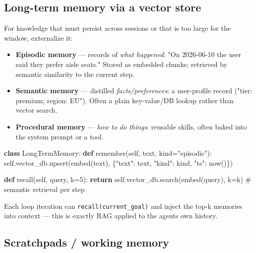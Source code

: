 \documentclass[11pt]{article}
\providecommand{\tightlist}{\setlength{\itemsep}{1pt}\setlength{\parskip}{0pt}}
\newenvironment{Shaded}{\begin{snugshade}}{\end{snugshade}}
\newcommand{\CommentTok}[1]{\textcolor[rgb]{0.48,0.49,0.49}{#1}}
\newcommand{\ControlFlowTok}[1]{\textcolor[rgb]{0.99,0.74,0.29}{\textbf{#1}}}
\newcommand{\DecValTok}[1]{\textcolor[rgb]{0.96,0.45,0.00}{#1}}
\newcommand{\KeywordTok}[1]{\textcolor[rgb]{0.81,0.81,0.76}{\textbf{#1}}}
\newcommand{\NormalTok}[1]{\textcolor[rgb]{0.81,0.81,0.76}{#1}}
\newcommand{\OperatorTok}[1]{\textcolor[rgb]{0.81,0.81,0.76}{#1}}
\newcommand{\StringTok}[1]{\textcolor[rgb]{0.96,0.31,0.31}{#1}}
\newcommand{\VariableTok}[1]{\textcolor[rgb]{0.15,0.68,0.68}{#1}}
\begin{document}
\subsection{Long-term memory via a vector store}\label{long-term-memory-via-a-vector-store}

For knowledge that must persist across sessions or that is too large for the window, externalize it:

\begin{itemize}
\tightlist
\item
  \textbf{Episodic memory} --- records of \emph{what happened}: "On 2026-06-10 the user said they prefer aisle seats." Stored as embedded chunks; retrieved by semantic similarity to the current step.
\item
  \textbf{Semantic memory} --- distilled \emph{facts/preferences}: a user-profile record ("tier: premium; region: EU"). Often a plain key-value/DB lookup rather than vector search.
\item
  \textbf{Procedural memory} --- \emph{how to do things}: reusable skills, often baked into the system prompt or a tool.
\end{itemize}


\begin{Shaded}
\begin{Highlighting}[]
\KeywordTok{class}\NormalTok{ LongTermMemory:}
    \KeywordTok{def}\NormalTok{ remember(}\VariableTok{self}\NormalTok{, text, kind}\OperatorTok{=}\StringTok{"episodic"}\NormalTok{):}
        \VariableTok{self}\NormalTok{.vector\_db.upsert(embed(text), \{}\StringTok{"text"}\NormalTok{: text, }\StringTok{"kind"}\NormalTok{: kind, }\StringTok{"ts"}\NormalTok{: now()\})}

    \KeywordTok{def}\NormalTok{ recall(}\VariableTok{self}\NormalTok{, query, k}\OperatorTok{=}\DecValTok{5}\NormalTok{):}
        \ControlFlowTok{return} \VariableTok{self}\NormalTok{.vector\_db.search(embed(query), k}\OperatorTok{=}\NormalTok{k)   }\CommentTok{\# semantic retrieval per step}
\end{Highlighting}
\end{Shaded}

Each loop iteration can \texttt{recall(current\_goal)} and inject the top-k memories into context --- this is exactly RAG applied to the agent\textquotesingle s own history.

\subsection{Scratchpads / working memory}\label{scratchpads--working-memory}
\end{document}
